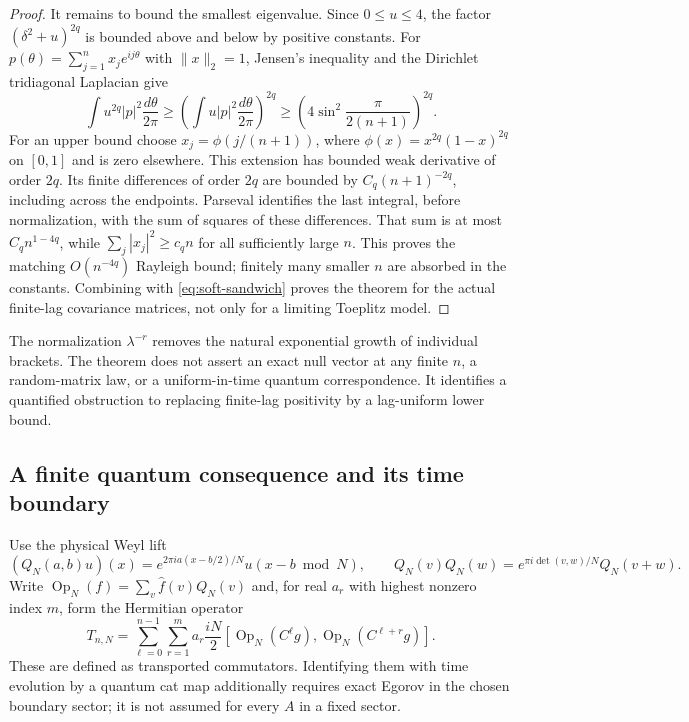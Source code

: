 \begin{proof}
It remains to bound the smallest eigenvalue. Since $0\le u\le4$, the factor
$(\delta^2+u)^{2q}$ is bounded above and below by positive constants.
For $p(\theta)=\sum_{j=1}^nx_je^{ij\theta}$ with $\|x\|_2=1$,
Jensen's inequality and the Dirichlet tridiagonal Laplacian give
\[
 \int u^{2q}|p|^2\frac{d\theta}{2\pi}
 \ge\left(\int u|p|^2\frac{d\theta}{2\pi}\right)^{2q}
 \ge\left(4\sin^2\frac{\pi}{2(n+1)}\right)^{2q}.
\]
For an upper bound choose $x_j=\phi(j/(n+1))$, where
$\phi(x)=x^{2q}(1-x)^{2q}$ on $[0,1]$ and is zero elsewhere.
This extension has bounded weak derivative of order $2q$.
Its finite differences of order $2q$ are bounded by $C_q(n+1)^{-2q}$,
including across the endpoints. Parseval identifies the last integral,
before normalization, with the sum of squares of these differences.
That sum is at most $C_q n^{1-4q}$, while $\sum_j|x_j|^2\ge c_qn$
for all sufficiently large $n$. This proves the matching $O(n^{-4q})$
Rayleigh bound; finitely many smaller $n$ are absorbed in the constants.
Combining with \eqref{eq:soft-sandwich} proves the theorem for the actual
finite-lag covariance matrices, not only for a limiting Toeplitz model.
\end{proof}

The normalization $\lambda^{-r}$ removes the natural exponential growth of
individual brackets. The theorem does not assert an exact null vector at any
finite $n$, a random-matrix law, or a uniform-in-time quantum correspondence.
It identifies a quantified obstruction to replacing finite-lag positivity by
a lag-uniform lower bound.

\subsection{A finite quantum consequence and its time boundary}
Use the physical Weyl lift
\[
 (Q_N(a,b)u)(x)=e^{2\pi ia(x-b/2)/N}u(x-b\bmod N),\qquad
 Q_N(v)Q_N(w)=e^{\pi i\det(v,w)/N}Q_N(v+w).
\]
Write $\operatorname{Op}_N(f)=\sum_v\widehat f(v)Q_N(v)$ and, for real
$a_r$ with highest nonzero index $m$, form the Hermitian operator
\[
 T_{n,N}=\sum_{\ell=0}^{n-1}\sum_{r=1}^m a_r\frac{iN}{2}
 [\operatorname{Op}_N(C^\ell g),\operatorname{Op}_N(C^{\ell+r}g)].
\]
These are defined as transported commutators. Identifying them with time
evolution by a quantum cat map additionally requires exact Egorov in the
chosen boundary sector; it is not assumed for every $A$ in a fixed sector.

